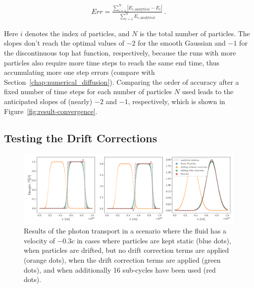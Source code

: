 \begin{align}
 Err = \frac{\sum_{i=1}^N |E_{i, \text{analytical}} - E_i|}{\sum_{i=1}^N E_{i, \text{analytical}}}
\ .
\end{align}

Here $i$ denotes the index of particles, and $N$ is the total number of particles. The slopes don't
reach the optimal values of $-2$ for the smooth Gaussian and $-1$ for the discontinuous top hat
function, respectively, because the runs with more particles also require more time steps to reach
the same end time, thus accumulating more one step errors (compare with
Section~\ref{chap:numerical_diffusion}). Comparing the order of accuracy after a fixed number of
time steps for each number of particles $N$ used leads to the anticipated slopes of (nearly) $-2$
and $-1$, respectively, which is shown in Figure~\ref{fig:result-convergence}.











\subsection{Testing the Drift Corrections}\label{chap:validation-drift-corrections}


\begin{figure}
 \centering
 \includegraphics[width=\textwidth]{figures/RHD/drift/0.3c-16cycles.png}%
 \caption{
Results of the photon transport in a scenario where the fluid has a velocity of $-0.3c$ in
cases where particles are kept static (blue dots), when particles are drifted, but no drift
correction terms are applied (orange dots), when the drift correction terms are applied (green
dots), and when additionally 16 sub-cycles have been used (red dots).
 }
 \label{fig:drift-0.3c}
\end{figure}


